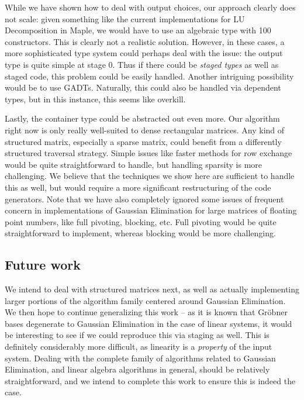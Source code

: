 \documentclass[11pt]{elsart}
\begin{document}
While we have shown how to deal with output choices, our approach
clearly does not scale: given something like the current implementations for 
LU Decomposition in Maple, we would have to use an algebraic type
with 100 constructors.  This is clearly not a realistic solution.
However, in these cases, a more sophisticated type system could
perhaps deal with the issue: the output type is quite simple at
stage 0.  Thus if there could be \emph{staged types} as well as
staged code, this problem could be easily handled.  Another intriguing
possibility would be to use GADTs.  Naturally, this could also be
handled via dependent types, but in this instance, this seems like
overkill.  

Lastly, the container type could be abstracted out even more.  Our
algorithm right now is only really well-suited to dense rectangular
matrices.  Any kind of structured matrix, especially a sparse matrix,
could benefit from a differently structured traversal strategy. 
Simple issues like faster methods for row exchange would be quite
straightforward to handle, but handling sparsity is more challenging.
We believe that the techniques we show here are sufficient to handle
this as well, but would require a more significant restructuring of
the code generators.  Note that we have also completely ignored 
some issues
of frequent concern in implementations of Gaussian Elimination for
large matrices of floating point numbers, like full pivoting, 
blocking, etc.  Full pivoting would be quite straightforward to 
implement, whereas blocking would be more challenging.

\subsection{Future work}

We intend to deal with structured matrices next, as well as actually
implementing larger portions of the algorithm family centered around
Gaussian Elimination.  We then hope to continue generalizing this work --
as it is known that Gr\"{o}bner bases degenerate to Gaussian Elimination
in the case of linear systems, it would be interesting to see if we could
reproduce this via staging as well.  This is definitely considerably
more difficult, as linearity is a \emph{property} of the input system.
Dealing with the complete family of algorithms related to Gaussian 
Elimination, and linear algebra algorithms in general, should be
relatively straightforward, and we intend to complete this work to
ensure this is indeed the case.
\end{document}
